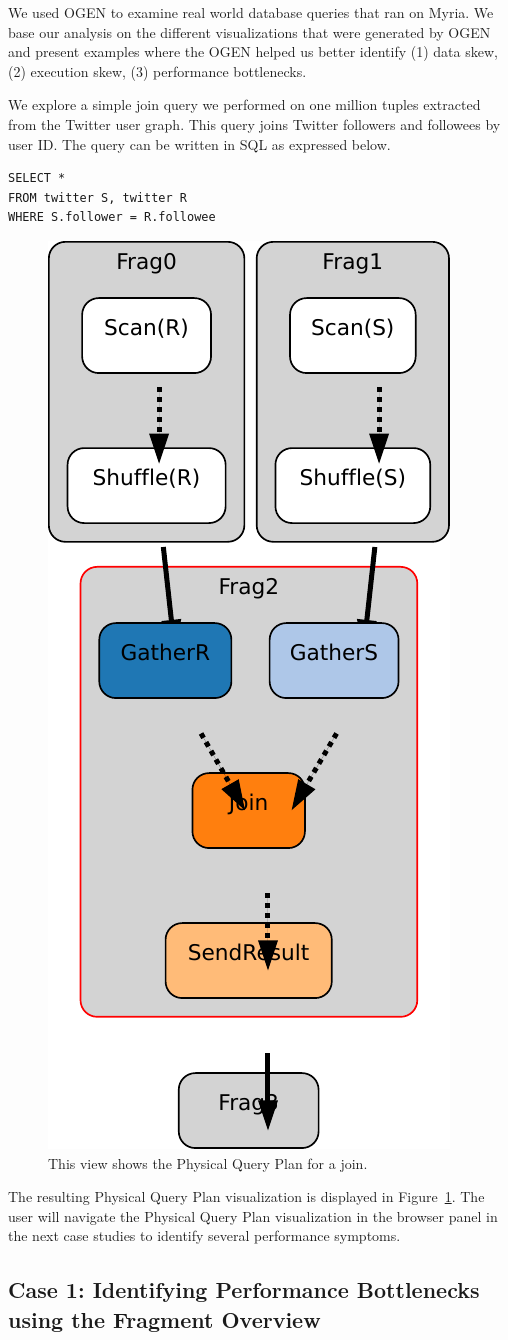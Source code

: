 \documentclass{chi2009}
\newcommand*{\system}{OGEN\xspace}
\newcommand*{\graph}{Physical Query Plan\xspace}
\newcommand*{\overall}{Fragment Overview\xspace}
\begin{document}
We used \system to examine real world database queries that ran on Myria. We base our analysis on the different visualizations that were generated by \system and present examples where the \system helped us better identify (1) data skew, (2) execution skew, (3) performance bottlenecks. 

We explore a simple join query we performed on one million tuples extracted from the Twitter user graph. This query joins Twitter followers and followees by user ID. The query can be written in SQL as expressed below.

\begin{lstlisting}
SELECT *
FROM twitter S, twitter R
WHERE S.follower = R.followee
\end{lstlisting}


\begin{figure}[ht]
  \centering
  \includegraphics[width=0.4\columnwidth]{images/graph_join}
  \caption{This view shows the \graph for a join.}
  \label{fig:join}
\end{figure}


The resulting \graph visualization is displayed in Figure~\ref{fig:join}. The user will navigate the \graph visualization in the browser panel in the next case studies to identify several performance symptoms.




\subsection{Case 1: Identifying Performance Bottlenecks using the \overall}
\end{document}

